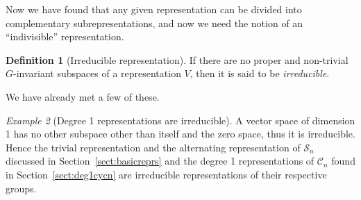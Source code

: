 \documentclass[12pt, a4paper, twoside]{article}
\theoremstyle{definition}
\newtheorem{definition}{Definition}[section]
\theoremstyle{remark}
\newtheorem{example}[definition]{Example}
\numberwithin{equation}{section}
\newcommand{\1}{\mathbf{1}}
\newcommand{\0}{\mathbf{0}}
\newcommand{\Sym}{\mathcal{S}} %
\newcommand{\Cyc}{\mathcal{C}}%
\begin{document}
	Now we have found that any given representation can be divided into complementary subrepresentations, and now we need the notion of an ``indivisible'' representation.
	
	\begin{definition}[Irreducible representation]
		If there are no proper and non-trivial $G$-invariant subspaces of a representation $V$, then it is said to be \textit{irreducible}. 
	\end{definition}
	
	We have already met a few of these.
	
	\begin{example}[Degree 1 representations are irreducible]\cite[Example 1.4.2.]{Sagan}
		A vector space of dimension 1 has no other subspace other than itself and the zero space, thus it is irreducible. Hence the trivial representation and the alternating representation of $\Sym_n$ discussed in Section~\ref{sect:basicreprs} and the degree 1 representations of $\Cyc_n$ found in Section~\ref{sect:deg1cycn} are irreducible representations of their respective groups.
	\end{example}	
		
	


\clearpage{\thispagestyle{empty}}



% 
\end{document}
